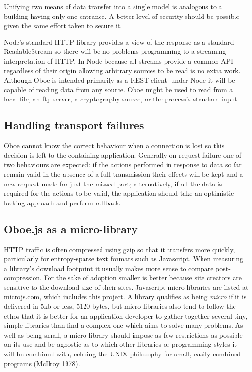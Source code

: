 \documentclass[12pt, ]{article}
\begin{document}
Unifying two means of data transfer into a single model is analogous to
a building having only one entrance. A better level of security should
be possible given the same effort taken to secure it.

Node's standard HTTP library provides a view of the response as a
standard ReadableStream so there will be no problems programming to a
streaming interpretation of HTTP. In Node because all streams provide a
common API regardless of their origin allowing arbitrary sources to be
read is no extra work. Although Oboe is intended primarily as a REST
client, under Node it will be capable of reading data from any source.
Oboe might be used to read from a local file, an ftp server, a
cryptography source, or the process's standard input.

\subsection{Handling transport
failures}\label{handling-transport-failures}

Oboe cannot know the correct behaviour when a connection is lost so this
decision is left to the containing application. Generally on request
failure one of two behaviours are expected: if the actions performed in
response to data so far remain valid in the absence of a full
transmission their effects will be kept and a new request made for just
the missed part; alternatively, if all the data is required for the
actions to be valid, the application should take an optimistic locking
approach and perform rollback.

\subsection{Oboe.js as a
micro-library}\label{oboe.js-as-a-micro-library}

HTTP traffic is often compressed using gzip so that it transfers more
quickly, particularly for entropy-sparse text formats such as
Javascript. When measuring a library's download footprint it usually
makes more sense to compare post-compression. For the sake of adoption
smaller is better because site creators are sensitive to the download
size of their sites. Javascript micro-libraries are listed at
\href{http://microjs.com}{microjs.com}, which includes this project. A
library qualifies as being \emph{micro} if it is delivered in 5kb or
less, 5120 bytes, but micro-libraries also tend to follow the ethos that
it is better for an application developer to gather together several
tiny, simple libraries than find a complex one which aims to solve many
problems. As well as being small, a micro-library should impose as few
restrictions as possible on its use and be agnostic as to which other
libraries or programming styles it will be combined with, echoing the
UNIX philosophy for small, easily combined programs (McIlroy 1978).
\end{document}
